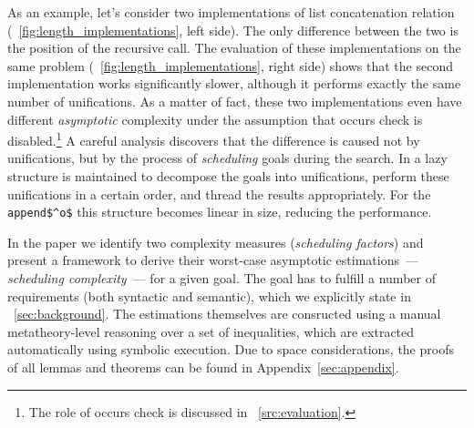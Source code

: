 As an example, let's consider two implementations of list concatenation relation (\figureword~\ref{fig:length_implementations}, left side). The only difference between the two is
the position of the recursive call.
The evaluation of these implementations on the same problem (\figureword~\ref{fig:length_implementations}, right side) shows that the second implementation works significantly
slower,
although it performs exactly the same number of unifications. As a matter of fact, these two implementations even have different \emph{asymptotic} complexity under the assumption
that occurs check is disabled.\footnote{The role of occurs check is discussed in
\sectionword~\ref{src:evaluation}.}
A careful analysis discovers that the difference is caused not by unifications, but by the process of \emph{scheduling} goals during the search. In \mK a
lazy structure is maintained to decompose the goals into unifications, perform these unifications in a certain order, and thread the results appropriately. For the \lstinline|append$^o$|
this structure becomes linear in size, reducing the performance.

In the paper we identify two complexity measures (\emph{scheduling factors}) and present a framework to derive their worst-case asymptotic estimations~--- \emph{scheduling complexity}~---
for a given goal. The goal has to fulfill a number of requirements (both syntactic and semantic), which we explicitly state in \sectionword~\ref{sec:background}. The estimations
themselves are consructed using a manual metatheory-level reasoning over a set of inequalities, which are extracted automatically using symbolic execution.
Due to space considerations, the proofs of all lemmas and theorems can be found in Appendix~\ref{sec:appendix}.


